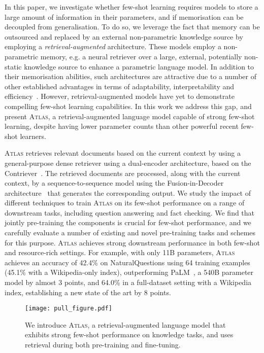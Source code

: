 \documentclass[10pt]{article} \usepackage[preprint]{tmlr}
\newcommand{\Atlas}{\textsc{Atlas}}
\begin{document}
In this paper, we investigate whether few-shot learning requires models to store a large amount of information in their parameters, and if memorisation can be decoupled from generalisation.
To do so, we leverage the fact that memory can be outsourced and replaced by an external non-parametric knowledge source by employing a \emph{retrieval-augmented} architecture. 
These models employ a non-parametric memory, e.g. a neural retriever  over a large, external, potentially non-static knowledge source to enhance a parametric language model.
In addition to their memorisation abilities, such architectures are attractive due to a number of other established advantages in terms of adaptability, interpretability and efficiency~\citep[][inter alia]{guu2020realm, lewis2020retrieval, yogatama-etal-2021-adaptive,borgeaud2021retro}.
However, retrieval-augmented models have yet to demonstrate compelling few-shot learning capabilities.
In this work we address this gap, and present \Atlas{}, a retrieval-augmented language model capable of strong few-shot learning, despite having lower parameter counts than other powerful recent few-shot learners.

\Atlas{} retrieves relevant documents based on the current context by using a general-purpose dense retriever using a dual-encoder architecture, based on the Contriever~\citep{izacard2022unsupervised}.
The retrieved documents are processed, along with the current context, by a sequence-to-sequence model using the Fusion-in-Decoder architecture~\citep{izacard2020leveraging} that generates the corresponding output. 
We study the impact of different techniques to train \Atlas{} on its few-shot performance on a range of downstream tasks, including question answering and fact checking.
We find that jointly pre-training the components is crucial for few-shot performance, and we carefully evaluate a number of existing and novel pre-training tasks and schemes for this purpose.
\Atlas{} achieves strong downstream performance in both few-shot and resource-rich settings.
For example, with only 11B parameters, \Atlas{} achieves an accuracy of 42.4\% on NaturalQuestions using 64 training examples (45.1\% with a Wikipedia-only index), outperforming PaLM~\citep{chowdhery2022palm}, a 540B parameter model by almost 3 points, and 64.0\% in a full-dataset setting with a Wikipedia index, establishing a new state of the art by 8 points.

\begin{figure}[t]
\centering
\texttt{[image: pull\_figure.pdf]}
\caption{We introduce \Atlas, a retrieval-augmented language model that exhibits strong few-shot performance on knowledge tasks, and uses retrieval during both pre-training and fine-tuning.}
\end{figure}
\end{document}
